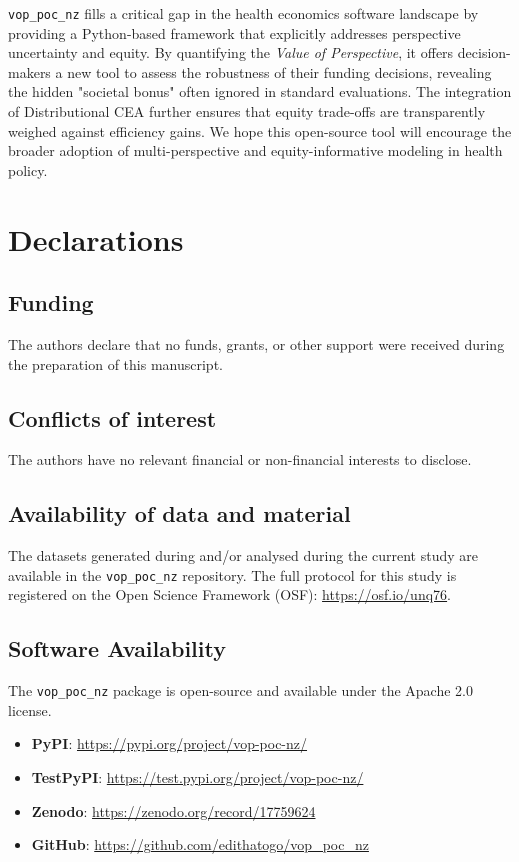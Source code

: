 \documentclass{article}
\newcommand{\pkg}[1]{\texttt{#1}}
\begin{document}
\pkg{vop\_poc\_nz} fills a critical gap in the health economics software landscape by providing a Python-based framework that explicitly addresses perspective uncertainty and equity.
By quantifying the \emph{Value of Perspective}, it offers decision-makers a new tool to assess the robustness of their funding decisions, revealing the hidden "societal bonus" often ignored in standard evaluations.
The integration of Distributional CEA further ensures that equity trade-offs are transparently weighed against efficiency gains.
We hope this open-source tool will encourage the broader adoption of multi-perspective and equity-informative modeling in health policy.

\section*{Declarations}

\subsection*{Funding}
The authors declare that no funds, grants, or other support were received during the preparation of this manuscript.

\subsection*{Conflicts of interest}
The authors have no relevant financial or non-financial interests to disclose.

\subsection*{Availability of data and material}
The datasets generated during and/or analysed during the current study are available in the \pkg{vop\_poc\_nz} repository.
The full protocol for this study is registered on the Open Science Framework (OSF): \url{https://osf.io/unq76}.

\subsection{Software Availability}
The \pkg{vop\_poc\_nz} package is open-source and available under the Apache 2.0 license.
\begin{itemize}
    \item \textbf{PyPI}: \url{https://pypi.org/project/vop-poc-nz/}
    \item \textbf{TestPyPI}: \url{https://test.pypi.org/project/vop-poc-nz/}
    \item \textbf{Zenodo}: \url{https://zenodo.org/record/17759624}
    \item \textbf{GitHub}: \url{https://github.com/edithatogo/vop_poc_nz}
\end{itemize}

\printbibliography
\end{document}
